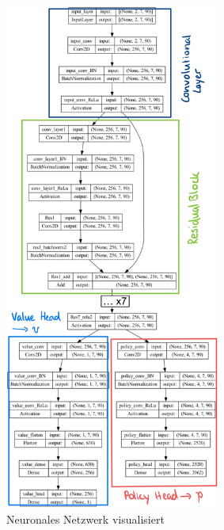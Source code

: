 \documentclass{jpp}
\begin{document}
\begin{figure}
\centering
\includegraphics[width={0.63\textwidth}]{imgs/model.jpg}
\caption{Neuronales Netzwerk visualisiert}
\label{fig:model}
\end{figure}
\end{document}
